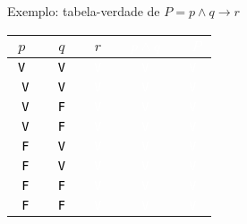 \begin{frame}[fragile]{Exemplo: tabela-verdade de $P = p \land q \to r$}

    \begin{table}
        \centering
        \begin{tabular}{>{\tt}c>{\tt}c>{\tt}c>{\tt}c>{\tt}c}
            \hline
            $p$ & $q$ & $r$ & \textcolor{white}{$p\land q$} & \textcolor{white}{$P$}\\
            \hline
            \textcolor{black}{V} & \textcolor{black}{V} & \textcolor{white}{V} & \textcolor{white}{V} & \textcolor{white}{V} \\
            \hline
            \textcolor{black}{V} & \textcolor{black}{V} & \textcolor{white}{V} & \textcolor{white}{V} & \textcolor{white}{V} \\
            \hline
            \textcolor{black}{V} & \textcolor{black}{F} & \textcolor{white}{V} & \textcolor{white}{V} & \textcolor{white}{V} \\
            \hline
            \textcolor{black}{V} & \textcolor{black}{F} & \textcolor{white}{V} & \textcolor{white}{V} & \textcolor{white}{V} \\
            \hline
            \textcolor{black}{F} & \textcolor{black}{V} & \textcolor{white}{V} & \textcolor{white}{V} & \textcolor{white}{V} \\
            \hline
            \textcolor{black}{F} & \textcolor{black}{V} & \textcolor{white}{V} & \textcolor{white}{V} & \textcolor{white}{V} \\
            \hline
            \textcolor{black}{F} & \textcolor{black}{F} & \textcolor{white}{V} & \textcolor{white}{V} & \textcolor{white}{V} \\
            \hline
            \textcolor{black}{F} & \textcolor{black}{F} & \textcolor{white}{V} & \textcolor{white}{V} & \textcolor{white}{V} \\
            \hline
        \end{tabular}
    \end{table}
\end{frame}

